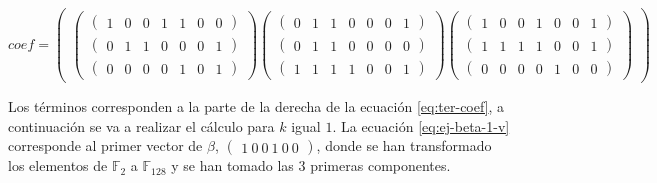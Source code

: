 \begin{equation}\label{eq:ej-coef}
	{coef} =
	\left(\begin{matrix}
		\left(\begin{matrix}
			\left(\begin{smallmatrix}1 & 0 & 0 & 1 & 1 & 0 & 0\end{smallmatrix}\right)\\
			\left(\begin{smallmatrix}0 & 1 & 1 & 0 & 0 & 0 & 1\end{smallmatrix}\right)\\
			\left(\begin{smallmatrix}0 & 0 & 0 & 0 & 1 & 0 & 1\end{smallmatrix}\right)
		\end{matrix}\right)
		\left(\begin{matrix}
			\left(\begin{smallmatrix}0 & 1 & 1 & 0 & 0 & 0 & 1\end{smallmatrix}\right)\\
			\left(\begin{smallmatrix}0 & 1 & 1 & 0 & 0 & 0 & 0\end{smallmatrix}\right)\\
			\left(\begin{smallmatrix}1 & 1 & 1 & 1 & 0 & 0 & 1\end{smallmatrix}\right)
		\end{matrix}\right)
		\left(\begin{matrix}
			\left(\begin{smallmatrix}1 & 0 & 0 & 1 & 0 & 0 & 1\end{smallmatrix}\right)\\
			\left(\begin{smallmatrix}1 & 1 & 1 & 1 & 0 & 0 & 1\end{smallmatrix}\right)\\
			\left(\begin{smallmatrix}0 & 0 & 0 & 0 & 1 & 0 & 0\end{smallmatrix}\right)
		\end{matrix}\right)
	\end{matrix}\right)
\end{equation}

Los términos corresponden a la parte de la derecha de la ecuación \ref{eq:ter-coef}, a continuación se va a realizar el cálculo para $k$ igual $1$. La ecuación \ref{eq:ej-beta-1-v} corresponde al primer vector de $\beta$, $\left(\begin{array}{c}1\ 0\ 0\ 1\ 0\ 0\end{array}\right)$, donde se han transformado los elementos de $\mathds{F}_2$ a $\mathds{F}_{128}$ y se han tomado las $3$ primeras componentes.


